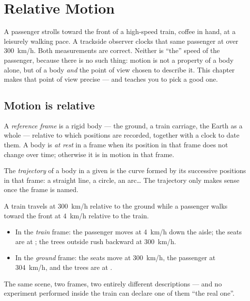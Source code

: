 \chapter{Relative Motion}\label{ch:g10:relative-motion}

A passenger strolls toward the front of a high-speed train, coffee in
hand, at a leisurely walking pace. A trackside observer clocks that same
passenger at over \qty{300}{km/h}. Both measurements are correct. Neither
is ``the'' speed of the passenger, because there is no such thing: motion
is not a property of a body alone, but of a body \emph{and} the point of
view chosen to describe it. This chapter makes that point of view precise
--- and teaches you to pick a good one.

\section{Motion is relative}

\begin{definition}\label{def:g10:relative-motion:frame}
A \emph{reference frame} is a rigid body --- the
ground, a train carriage, the Earth as a whole --- relative to which
positions are recorded, together with a clock to date them. A body is
\emph{at rest} in a frame when its position in that frame
does not change over time; otherwise it is in motion in that frame.
\end{definition}

\begin{definition}[Trajectory]\label{def:g10:relative-motion:trajectory}
The \emph{trajectory} of a body in a given  is the curve formed by its successive positions in that frame: a
straight line, a circle, an arc\dots{} The trajectory only makes sense
once the frame is named.
\end{definition}

\begin{example}\label{ex:g10:relative-motion:walker}
A train travels at \qty{300}{km/h} relative to the ground while a
passenger walks toward the front at \qty{4}{km/h} relative to the train.
\begin{itemize}
  \item In the \emph{train} frame: the passenger moves at \qty{4}{km/h}
        down the aisle; the seats are at ; the trees outside rush
        backward at \qty{300}{km/h}.
  \item In the \emph{ground} frame: the seats move at \qty{300}{km/h},
        the passenger at \qty{304}{km/h}, and the trees are at .
\end{itemize}
The same scene, two frames, two entirely different descriptions --- and
no experiment performed inside the train can declare one of them ``the
real one''.
\end{example}

